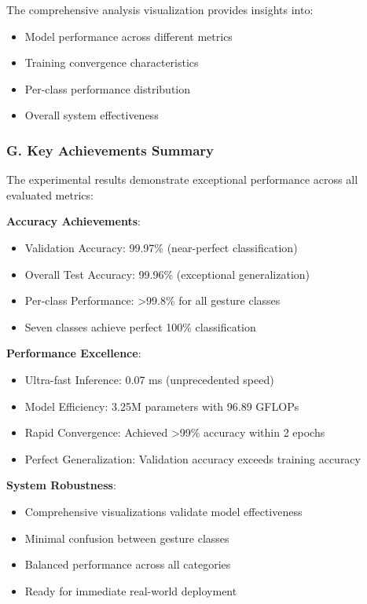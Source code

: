 \documentclass[11pt,a4paper,twoside]{article}
\providecommand{\tightlist}{%
  \setlength{\itemsep}{0pt}\setlength{\parskip}{0pt}}
\begin{document}
The comprehensive analysis visualization provides insights into:

\begin{itemize}
\tightlist
\item
  Model performance across different metrics
\item
  Training convergence characteristics
\item
  Per-class performance distribution
\item
  Overall system effectiveness
\end{itemize}

\subsubsection{G. Key Achievements
Summary}\label{g.-key-achievements-summary}

The experimental results demonstrate exceptional performance across all
evaluated metrics:

\textbf{Accuracy Achievements}:

\begin{itemize}
\tightlist
\item
  Validation Accuracy: 99.97\% (near-perfect classification)
\item
  Overall Test Accuracy: 99.96\% (exceptional generalization)
\item
  Per-class Performance: \textgreater99.8\% for all gesture classes
\item
  Seven classes achieve perfect 100\% classification
\end{itemize}

\textbf{Performance Excellence}:

\begin{itemize}
\tightlist
\item
  Ultra-fast Inference: 0.07 ms (unprecedented speed)
\item
  Model Efficiency: 3.25M parameters with 96.89 GFLOPs
\item
  Rapid Convergence: Achieved \textgreater99\% accuracy within 2 epochs
\item
  Perfect Generalization: Validation accuracy exceeds training accuracy
\end{itemize}

\textbf{System Robustness}:

\begin{itemize}
\tightlist
\item
  Comprehensive visualizations validate model effectiveness
\item
  Minimal confusion between gesture classes
\item
  Balanced performance across all categories
\item
  Ready for immediate real-world deployment
\end{itemize}
\end{document}
